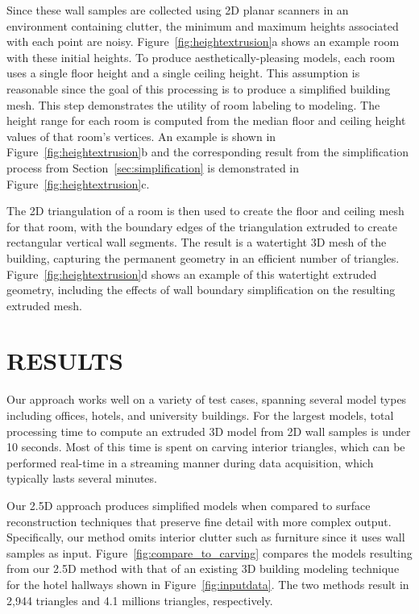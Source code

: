 \documentclass[a4paper,twoside]{article}
\begin{document}
Since these wall samples are collected using 2D planar scanners in an environment containing clutter, the minimum and maximum heights associated with each point are noisy.  Figure~\ref{fig:heightextrusion}a shows an example room with these initial heights.  To produce aesthetically-pleasing models, each room uses a single floor height and a single ceiling height.  This assumption is reasonable since the goal of this processing is to produce a simplified building mesh.  This step demonstrates the utility of room labeling to modeling.  The height range for each room is computed from the median floor and ceiling height values of that room's vertices.  An example is shown in Figure~\ref{fig:heightextrusion}b and the corresponding result from the simplification process from Section~\ref{sec:simplification} is demonstrated in Figure~\ref{fig:heightextrusion}c.

The 2D triangulation of a room is then used to create the floor and ceiling mesh for that room, with the boundary edges of the triangulation extruded to create rectangular vertical wall segments.  The result is a watertight 3D mesh of the building, capturing the permanent geometry in an efficient number of triangles.  Figure~\ref{fig:heightextrusion}d shows an example of this watertight extruded geometry, including the effects of wall boundary simplification on the resulting extruded mesh.

\section{\uppercase{Results}}
\label{sec:results}

\noindent Our approach works well on a variety of test cases, spanning several model types including offices, hotels, and university buildings.  For the largest models, total processing time to compute an extruded 3D model from 2D wall samples is under 10 seconds.  Most of this time is spent on carving interior triangles, which can be performed real-time in a streaming manner during data acquisition, which typically lasts several minutes.

Our 2.5D approach produces simplified models when compared to surface reconstruction techniques that preserve fine detail with more complex output.  Specifically, our method omits interior clutter such as furniture since it uses wall samples as input.  Figure~\ref{fig:compare_to_carving} compares the models resulting from our 2.5D method with that of an existing 3D building modeling technique~\cite{Turner13} for the hotel hallways shown in Figure~\ref{fig:inputdata}.  The two methods result in 2,944 triangles and 4.1 millions triangles, respectively.
\end{document}
